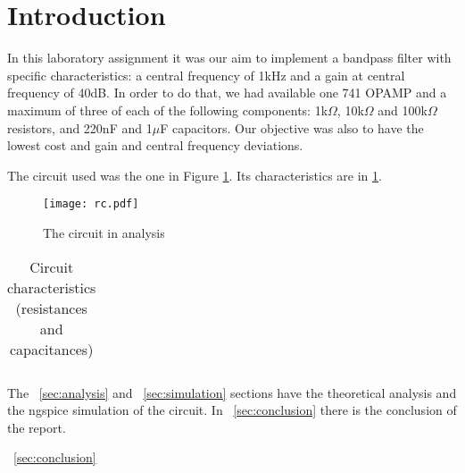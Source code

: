 \section{Introduction}
\label {sec:introduction}


In this laboratory assignment it was our aim to implement a bandpass filter with specific characteristics: a central frequency of 1kHz and a gain at central frequency of 40dB. In order to do that, we had available one 741 OPAMP and a maximum of three of each of the following components: 1k$\Omega$, 10k$\Omega$ and 100k$\Omega$ resistors, and 220nF and 1$\mu$F capacitors. Our objective was also to have the lowest cost and gain and central frequency deviations.

The circuit used was the one in Figure \ref{fig:circuit}. Its characteristics are in \ref{tab:circuit}.


\begin{figure}[H] \centering
\texttt{[image: rc.pdf]}
\caption{The circuit in analysis}
\label{fig:circuit}
\end{figure}


\begin{table}[H]
  \centering
  \begin{tabular}{|c|c|}
    \hline
      
  \end{tabular}
  \caption{Circuit characteristics (resistances and capacitances)}
  \label{tab:circuit}
\end{table}


%      

The ~\ref{sec:analysis} and ~\ref{sec:simulation} sections have the theoretical analysis and the ngspice simulation of the circuit. In ~\ref{sec:conclusion} there is the conclusion of the report.


~\ref{sec:conclusion}
